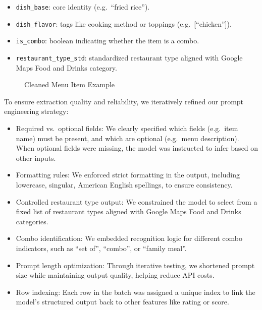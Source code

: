 \documentclass[
  11pt,
  a4paper,
  DIV=11,
  numbers=noendperiod]{scrartcl}
\providecommand{\tightlist}{%
  \setlength{\itemsep}{0pt}\setlength{\parskip}{0pt}}\usepackage{longtable,booktabs,array}
\begin{document}
\begin{itemize}
\tightlist
\item
  \texttt{dish\_base}: core identity (e.g.~``fried rice'').
\item
  \texttt{dish\_flavor}: tags like cooking method or toppings
  (e.g.~{[}``chicken''{]}).
\item
  \texttt{is\_combo}: boolean indicating whether the item is a combo.
\item
  \texttt{restaurant\_type\_std}: standardized restaurant type aligned
  with Google Maps Food and Drinks category.
\end{itemize}

\begin{figure}

\caption{\label{fig-cleaned-example}Cleaned Menu Item Example}


\end{figure}%

To ensure extraction quality and reliability, we iteratively refined our
prompt engineering strategy:

\begin{itemize}
\tightlist
\item
  Required vs.~optional fields: We clearly specified which fields
  (e.g.~item name) must be present, and which are optional (e.g.~menu
  description). When optional fields were missing, the model was
  instructed to infer based on other inputs.
\item
  Formatting rules: We enforced strict formatting in the output,
  including lowercase, singular, American English spellings, to ensure
  consistency.
\item
  Controlled restaurant type output: We constrained the model to select
  from a fixed list of restaurant types aligned with Google Maps Food
  and Drinks categories.
\item
  Combo identification: We embedded recognition logic for different
  combo indicators, such as ``set of'', ``combo'', or ``family meal''.
\item
  Prompt length optimization: Through iterative testing, we shortened
  prompt size while maintaining output quality, helping reduce API
  costs.
\item
  Row indexing: Each row in the batch was assigned a unique index to
  link the model's structured output back to other features like rating
  or score.
\end{itemize}
\end{document}
